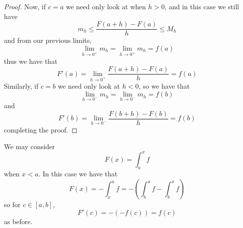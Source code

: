 \begin{proof}
    Now, if $c = a$ we need only look at when $h > 0$, and in this case we still have  \begin{equation*}
        m_h \leq \frac{F(a+h) - F(a)}{h} \leq M_h
    \end{equation*}
    and from our previous limits, \begin{equation*}
        \lim\limits_{h\rightarrow 0^+}m_h = \lim\limits_{h\rightarrow 0^+}m_h = f(a)
    \end{equation*}
    thus we have that $$F'(a) = \lim\limits_{h\rightarrow 0^+}\frac{F(a+h)-F(a)}{h} = f(a)$$
    Similarly, if $c = b$ we need only look at $h < 0$, so we have that \begin{equation*}
        \lim\limits_{h\rightarrow 0^-}m_h = \lim\limits_{h\rightarrow 0^-}m_h = f(b)
    \end{equation*}
    and $$F'(b) = \lim\limits_{h\rightarrow 0^-}\frac{F(b+h)-F(b)}{h} = f(b)$$
    completing the proof.
\end{proof}

We may consider \begin{equation}
    F(x) = \int_a^xf
\end{equation}
when $x < a$. In this case we have that \begin{equation}
    F(x) = -\int_x^af = -\left(\int_b^af - \int_b^xf\right)
\end{equation}
so for $c \in [a,b]$, \begin{equation}
    F'(c) = -(-f(c)) = f(c)
\end{equation}
as before.

